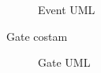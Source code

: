 \begin{figure}[h]
	\caption{\label{fig:subcaption_example}Event UML}
\end{figure}

Gate costam

\begin{figure}[h]
	\caption{\label{fig:subcaption_example}Gate UML}
\end{figure}

